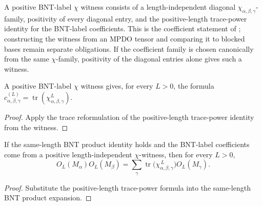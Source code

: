 \begin{definition}%
    \label{def:mpdo_positive_bnt_label_chi_trace_power_form}
    \leanok
    A positive BNT-label $\chi$ witness consists of a length-independent
    diagonal $\chi_{\alpha,\beta,\gamma}$-family, positivity of every
    diagonal entry, and the positive-length trace-power identity for the
    BNT-label coefficients. This is the coefficient statement of
    \cite[Theorem~4.14(ii)]{Cirac2016MPDO_arXiv}; constructing the witness from an MPDO tensor and
    comparing it to blocked bases remain separate obligations.
    If the coefficient family is chosen canonically from the same
    $\chi$-family, positivity of the diagonal entries alone gives such a
    witness.
\end{definition}

\begin{theorem}%
    \label{thm:mpdo_positive_bnt_label_chi_eq_trace_matrix_pow}
    \leanok
    A positive BNT-label $\chi$ witness gives, for every $L>0$, the formula
    $c^{(L)}_{\alpha,\beta,\gamma}
        =\operatorname{tr}(\chi_{\alpha,\beta,\gamma}^{L})$.
\end{theorem}
\begin{proof}\leanok
    Apply the trace reformulation of the positive-length trace-power identity
    from the witness.
\end{proof}

\begin{theorem}%
    \label{thm:mpdo_bnt_label_same_length_product_eq_sum_chi_trace_pow}
    \leanok
    If the same-length BNT product identity holds and the BNT-label
    coefficients come from a positive length-independent $\chi$-witness, then
    for every $L>0$,
    \[
        O_L(M_\alpha)O_L(M_\beta)
        = \sum_\gamma
        \operatorname{tr}\bigl(    \chi_{\alpha,\beta,\gamma}^{\,L}
        \bigr) O_L(M_\gamma).
    \]
\end{theorem}
\begin{proof}\leanok
    Substitute the positive-length trace-power formula into the same-length BNT
    product expansion.
\end{proof}

